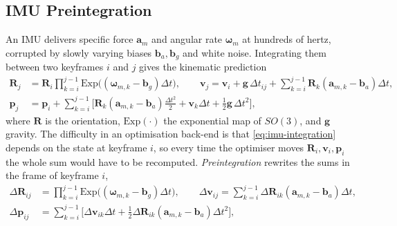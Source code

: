 \documentclass[graybox,envcountchap]{style/SNmono}
\begin{document}
\subsection{IMU Preintegration}
\label{subsec:imu-preintegration}
An IMU delivers specific force $\mathbf{a}_m$ and angular rate $\boldsymbol{\omega}_m$ at hundreds of hertz, corrupted by slowly varying biases $\mathbf{b}_a,\mathbf{b}_g$ and white noise. Integrating them between two keyframes $i$ and $j$ gives the kinematic prediction
\begin{align}
\mathbf{R}_j&=\mathbf{R}_i\prod_{k=i}^{j-1}\mathrm{Exp}\big((\boldsymbol{\omega}_{m,k}-\mathbf{b}_g)\Delta t\big),\qquad
\mathbf{v}_j=\mathbf{v}_i+\mathbf{g}\,\Delta t_{ij}+\sum_{k=i}^{j-1}\mathbf{R}_k(\mathbf{a}_{m,k}-\mathbf{b}_a)\Delta t,\nonumber\\
\mathbf{p}_j&=\mathbf{p}_i+\sum_{k=i}^{j-1}\Big[\mathbf{R}_k(\mathbf{a}_{m,k}-\mathbf{b}_a)\tfrac{\Delta t^{2}}{2}+\mathbf{v}_k\Delta t+\tfrac12\mathbf{g}\,\Delta t^{2}\Big],
\label{eq:imu-integration}
\end{align}
where $\mathbf{R}$ is the orientation, $\mathrm{Exp}(\cdot)$ the exponential map of $SO(3)$, and $\mathbf{g}$ gravity. The difficulty in an optimisation back-end is that \eqref{eq:imu-integration} depends on the state at keyframe $i$, so every time the optimiser moves $\mathbf{R}_i,\mathbf{v}_i,\mathbf{p}_i$ the whole sum would have to be recomputed. \emph{Preintegration} \cite{forster2017_preintegration} rewrites the sums in the frame of keyframe $i$,
\begin{align}
\Delta\mathbf{R}_{ij}&=\prod_{k=i}^{j-1}\mathrm{Exp}\big((\boldsymbol{\omega}_{m,k}-\mathbf{b}_g)\Delta t\big),\qquad
\Delta\mathbf{v}_{ij}=\sum_{k=i}^{j-1}\Delta\mathbf{R}_{ik}(\mathbf{a}_{m,k}-\mathbf{b}_a)\Delta t,\nonumber\\
\Delta\mathbf{p}_{ij}&=\sum_{k=i}^{j-1}\Big[\Delta\mathbf{v}_{ik}\Delta t+\tfrac12\Delta\mathbf{R}_{ik}(\mathbf{a}_{m,k}-\mathbf{b}_a)\Delta t^{2}\Big],
\label{eq:imu-preintegration}
\end{align}
\end{document}
